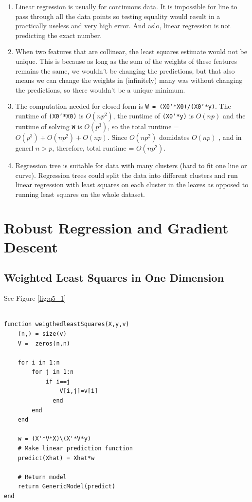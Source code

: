 \documentclass{article}
\begin{document}
\begin{enumerate}
\item Linear regression is usually for continuous data. It is impossible for line to pass through all the data points so testing equality would result in a practically useless and very high error. And aslo, linear regression is not predicting the exact number.
\item 
When two features that are collinear, the least squares estimate would not be unique. This is because as long as the sum of the weights of these features remains the same, we wouldn't be changing the predictions, but that also means we can change the weights in (infinitely) many was without changing the predictions, so there wouldn't be a unique minimum.

\item 
The computation needed for closed-form is \texttt{W = (X0'*X0)/(X0'*y)}. 
The runtime of  \texttt{(X0'*X0)} is $O(np^2)$, the runtime of \texttt{(X0'*y)} is $O(np)$ and  
the runtime of solving \texttt{W} is $O(p^3)$, so the total runtime  = $O(p^3) +O(np^2) + O(np)$.
Since $O(np^2)$ domidates $O(np)$ , and in generl $n>p$, therefore, total runtime = $O(np^2)$.


\item
Regression tree is suitable for data with many clusters (hard to fit one line or curve). Regression trees could split the data into different clusters and run linear regression with least squares on each cluster in the leaves as opposed to running least squares on the whole dataset.

\end{enumerate}

\section{Robust Regression and Gradient Descent}

\subsection{Weighted Least Squares in One Dimension}

See Figure \ref{fig:q5_1}\\

  \begin{verbatim}

function weigthedleastSquares(X,y,v)
    (n,) = size(v)
    V =  zeros(n,n)
     
    for i in 1:n
        for j in 1:n
            if i==j
                V[i,j]=v[i]
              end 
        end
    end
    
    w = (X'*V*X)\(X'*V*y)
    # Make linear prediction function
    predict(Xhat) = Xhat*w

    # Return model
    return GenericModel(predict)
end

  \end{verbatim}
\end{document}
